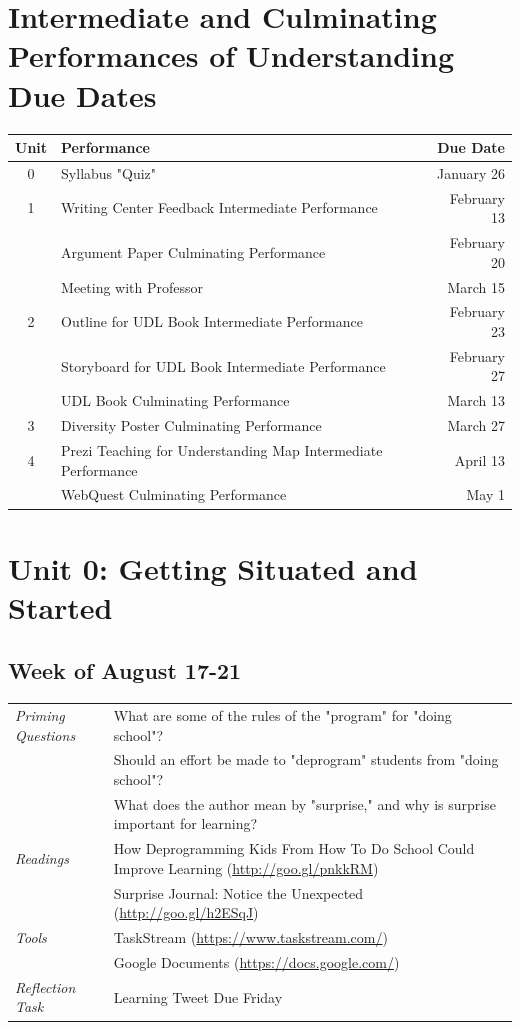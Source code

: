 \documentclass{tufte-handout}
\newcommand{\tabpq}{\faQuestionCircle\medspace\textit{Priming Questions}}
\newcommand{\tabread}{\faBook\medspace\textit{Readings}}
\newcommand{\tabtools}{\faWrench\medspace\textit{Tools}}
\newcommand{\tabtweet}{\faLightbulbO\medspace\textit{Reflection Task} & Learning Tweet Due Friday \\}
\newenvironment{tabsched}
	{\small
	\begin{tabular}{p{1.5in}p{4.5in}}
	\toprule}
	{\bottomrule
	\end{tabular}
	\normalsize}
\newcommand{\weekone}{August 17-21}
\begin{document}
\medskip

\section{Intermediate and Culminating Performances of Understanding Due Dates}
\begin{tabular}{clr}
	\toprule
	Unit & Performance & Due Date \\
	\midrule\midrule
	0 & Syllabus "Quiz" & January 26 \\
	\midrule
	1 & Writing Center Feedback Intermediate Performance & February 13 \\
	& Argument Paper Culminating Performance & February 20 \\
	& Meeting with Professor & March 15 \\
	\midrule
	2 & Outline for UDL Book Intermediate Performance & February 23 \\
	& Storyboard for UDL Book Intermediate Performance & February 27 \\
	& UDL Book Culminating Performance & March 13 \\
	\midrule
	3 & Diversity Poster Culminating Performance & March 27 \\
	\midrule
	4 & Prezi Teaching for Understanding Map Intermediate Performance  & April 13 \\
	& WebQuest Culminating Performance & May 1 \\
	\bottomrule
\end{tabular}

\section{Unit 0: Getting Situated and Started}

\subsection{Week of \weekone}

\begin{tabsched}
	\tabpq & What are some of the rules of the "program" for "doing school"? \\
	& Should an effort be made to "deprogram" students from "doing school"? \\
	& What does the author mean by "surprise," and why is surprise important for learning? \\
	\midrule
	\tabread & How Deprogramming Kids From How To Do School Could Improve Learning (\url{http://goo.gl/pnkkRM}) \\
	& Surprise Journal: Notice the Unexpected (\url{http://goo.gl/h2ESqJ}) \\
	\midrule
	\tabtools & TaskStream (\url{https://www.taskstream.com/}) \\
	& Google Documents (\url{https://docs.google.com/}) \\
	\midrule
	\tabtweet
\end{tabsched}
\end{document}
